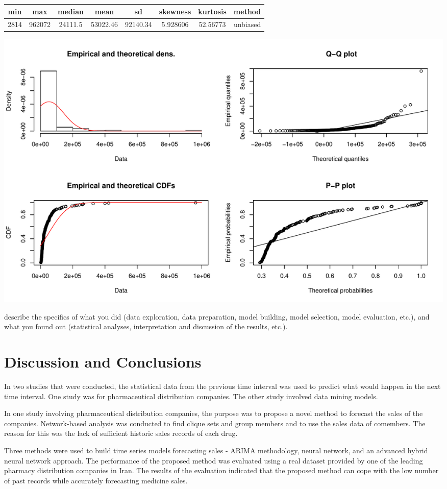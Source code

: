 \documentclass[]{elsarticle} %
\makeatletter
\def\maxwidth{\ifdim\Gin@nat@width>\linewidth\linewidth
\else\Gin@nat@width\fi}
\let\Oldincludegraphics\includegraphics
\renewcommand{\includegraphics}[1]{\Oldincludegraphics[width=\maxwidth]{#1}}
\makeatother
\begin{document}
\begin{longtable}[]{@{}cccccccc@{}}
\toprule
min & max & median & mean & sd & skewness & kurtosis &
method\tabularnewline
\midrule
\endhead
2814 & 962072 & 24111.5 & 53022.46 & 92140.34 & 5.928606 & 52.56773 &
unbiased\tabularnewline
\bottomrule
\end{longtable}

\includegraphics{Final_Project_files/figure-latex/unnamed-chunk-11-1.pdf}

describe the specifics of what you did (data exploration, data
preparation, model building, model selection, model evaluation, etc.),
and what you found out (statistical analyses, interpretation and
discussion of the results, etc.).

\section{Discussion and Conclusions}\label{discussion-and-conclusions}

In two studies that were conducted, the statistical data from the
previous time interval was used to predict what would happen in the next
time interval. One study was for pharmaceutical distribution companies.
The other study involved data mining models.

In one study involving pharmaceutical distribution companies, the
purpose was to propose a novel method to forecast the sales of the
companies. Network-based analysis was conducted to find clique sets and
group members and to use the sales data of comembers. The reason for
this was the lack of sufficient historic sales records of each drug.

Three methods were used to build time series models forecasting sales -
ARIMA methodology, neural network, and an advanced hybrid neural network
approach. The performance of the proposed method was evaluated using a
real dataset provided by one of the leading pharmacy distribution
companies in Iran. The results of the evaluation indicated that the
proposed method can cope with the low number of past records while
accurately forecasting medicine sales.
\end{document}

